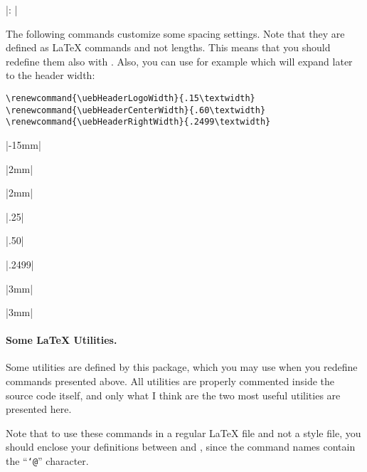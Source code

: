 \documentclass[11pt,a4paper]{article}
\begin{document}
\pkgdefdefault|\small \ueb@TheDueByLabel{}: \ueb@TheDueBy|

The following commands customize some spacing settings. Note that they are defined as
\LaTeX{} commands and not lengths. This means that you should redefine them also with
. Also, you can use for example  which will
expand later to the header width:
\begin{pkgverbatim}
\begin{verbatim}
\renewcommand{\uebHeaderLogoWidth}{.15\textwidth}
\renewcommand{\uebHeaderCenterWidth}{.60\textwidth}
\renewcommand{\uebHeaderRightWidth}{.2499\textwidth}
\end{verbatim}
\end{pkgverbatim}

\pkgdefdefault|-15mm|

\pkgdefdefault|2mm|

\pkgdefdefault|2mm|

\pkgdefdefault|.25\textwidth|

\pkgdefdefault|.50\textwidth|

\pkgdefdefault|.2499\textwidth|

\pkgdefdefault|3mm|

\pkgdefdefault|3mm|




\paragraph{Some \LaTeX{} Utilities.} Some utilities are defined by this package,
which you may use when you redefine commands presented above.
All utilities are properly commented inside the source code itself, and only what I think
are the two most useful utilities are presented here.

Note that to use these
commands in a regular \LaTeX{} file and not a style file, you should enclose your
definitions between  and , since the command
names contain the ``\texttt{\char`@}'' character.
\end{document}
